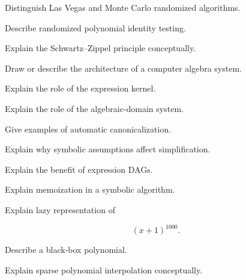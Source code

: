 \begin{exercise}[3]
Distinguish Las Vegas and Monte Carlo randomized algorithms.
\end{exercise}

\begin{exercise}[3]
Describe randomized polynomial identity testing.
\end{exercise}

\begin{exercise}[3]
Explain the Schwartz--Zippel principle conceptually.
\end{exercise}

\begin{exercise}[3]
Draw or describe the architecture of a computer algebra system.
\end{exercise}

\begin{exercise}[3]
Explain the role of the expression kernel.
\end{exercise}

\begin{exercise}[3]
Explain the role of the algebraic-domain system.
\end{exercise}

\begin{exercise}[3]
Give examples of automatic canonicalization.
\end{exercise}

\begin{exercise}[3]
Explain why symbolic assumptions affect simplification.
\end{exercise}

\begin{exercise}[3]
Explain the benefit of expression DAGs.
\end{exercise}

\begin{exercise}[3]
Explain memoization in a symbolic algorithm.
\end{exercise}

\begin{exercise}[3]
Explain lazy representation of

\[
(x+1)^{1000}.
\]
\end{exercise}

\begin{exercise}[3]
Describe a black-box polynomial.
\end{exercise}

\begin{exercise}[3]
Explain sparse polynomial interpolation conceptually.
\end{exercise}

